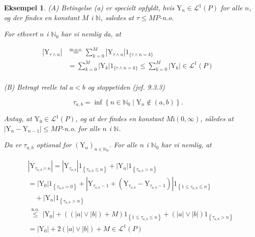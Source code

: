 \documentclass{article}
\newcommand{\1}{\mathbbm{1}}
\theoremstyle{boxed}
\newtheorem{example}[theorem]{Eksempel}
\begin{document}
\begin{example}
    (A) Betingelse (a) er specielt opfyldt, hvis $\mathrm{Y}_n \in \mathcal{L}^1(P)$ for alle $n$, og der findes en konstant $M$ i $\mathbb{N}$, saledes at $\tau \leq M P$-n.o.

For ethvert $n$ i $\mathbb{N}_0$ har vi nemlig da, at

$$
\begin{aligned}
\left|\mathrm{Y}_{\tau \wedge n}\right| & \stackrel{\mathrm{m.o.o} .}{=} \sum_{k=0}^M\left|\mathrm{Y}_{\tau \wedge n}\right| 1_{\{\tau \wedge n=k\}} \\
& =\sum_{k=0}^M\left|\mathrm{Y}_k\right| 1_{\{\tau \wedge n=k\}} \leq \sum_{k=0}^M\left|\mathrm{Y}_k\right| \in \mathcal{L}^1(P)
\end{aligned}
$$
\\(B) Betragt reelle tal $a<b$ og stoppetiden (jvf. 9.3.3)

$$
\tau_{a, b}=\inf \left\{n \in \mathbb{N}_0 \mid \mathrm{Y}_n \notin(a, b)\right\} .
$$


Antag, at $\mathrm{Y}_0 \in \mathcal{L}^1(P)$, og at der findes en konstant $M \mathrm{i}(0, \infty)$, således at $\left|\mathrm{Y}_n-\mathrm{Y}_{n-1}\right| \leq M P$-n.o. for alle $n$ i $\mathbb{N}$.

Da er $\tau_{a, b}$ optional for $\left(\mathrm{Y}_n\right)_{n \in \mathbb{N}_0}$. For alle $n$ i $\mathbb{N}_0$ har vi nemlig, at

$$
\begin{aligned}
& \left|\mathrm{Y}_{\tau_{a, b} \wedge n}\right|=\left|\mathrm{Y}_{\tau_{a, b}}\right| 1_{\left\{\tau_{a, b} \leq n\right\}}+\left|\mathrm{Y}_n\right| 1_{\left\{\tau_{a, b}>n\right\}} \\
& =\left|\mathrm{Y}_0\right| 1_{\left\{\tau_{a, b}=0\right\}}+\left|\mathrm{Y}_{\tau_{a, b}-1}+\left(\mathrm{Y}_{\tau_{a, b}}-\mathrm{Y}_{\tau_{a, b}-1}\right)\right| 1_{\left\{1 \leq \tau_{a, b} \leq n\right\}} \\
& \quad+\left|\mathrm{Y}_n\right| 1_{\left\{\tau_{a, b}>n\right\}} \\
& \stackrel{\text { n.o. }}{\leq}\left|\mathrm{Y}_0\right|+((|a| \vee|b|)+M) 1_{\left\{1 \leq \tau_{a, b} \leq n\right\}}+(|a| \vee|b|) 1_{\left\{\tau_{a, b}>n\right\}} \\
& =\left|\mathrm{Y}_0\right|+2(|a| \vee|b|)+M \in \mathcal{L}^1(P)
\end{aligned}
$$

\end{example}
\end{document}

